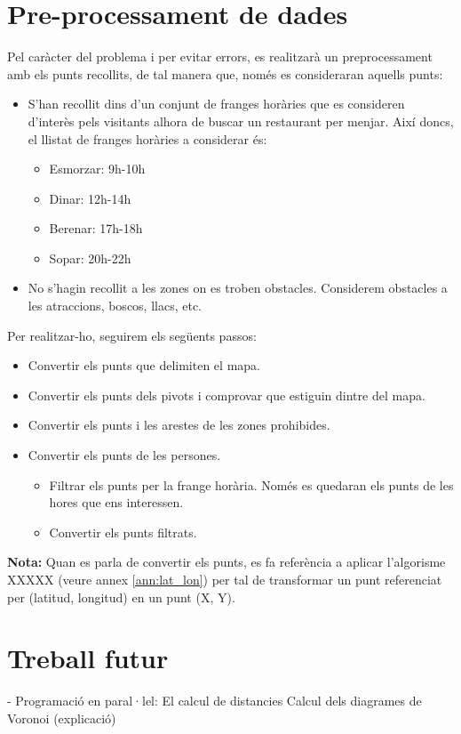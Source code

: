 \documentclass[12pt]{article}
\begin{document}
\clearpage
\section{Pre-processament de dades\label{pd}}
Pel caràcter del problema i per evitar errors, es realitzarà un preprocessament amb els punts recollits, de tal manera que, només es consideraran aquells punts:
\begin{itemize}
	\item S’han recollit dins d’un conjunt de franges horàries que es consideren d'interès pels visitants alhora de buscar un restaurant per menjar. 
	Així doncs, el llistat de franges horàries a considerar és:
	\begin{itemize}
		\item Esmorzar: 9h-10h
		\item Dinar: 12h-14h
		\item Berenar: 17h-18h
		\item Sopar: 20h-22h
	\end{itemize}

	\item No s’hagin recollit a les zones on es troben obstacles. 
	Considerem obstacles a les atraccions, boscos, llacs, etc.
\end{itemize}

Per realitzar-ho, seguirem els següents passos:
\begin{itemize}
	\item Convertir els punts que delimiten el mapa.
	\item Convertir els punts dels pivots i comprovar que estiguin dintre del mapa.
	\item Convertir els punts i les arestes de les zones prohibides.
	\item Convertir els punts de les persones.
	\begin{itemize}
		\item Filtrar els punts per la frange horària. Només es quedaran els punts de les hores que ens interessen.
		\item Convertir els punts filtrats.
	\end{itemize}
\end{itemize}

\textbf{Nota:} Quan es parla de convertir els punts, es fa referència a aplicar l'algorisme XXXXX (veure annex \ref{ann:lat_lon}) per tal de transformar un punt referenciat per (latitud, longitud) en un punt (X, Y).

\clearpage
\section{Treball futur}
- Programació en paral·lel:
	El calcul de distancies
	Calcul dels diagrames de Voronoi (explicació)
\end{document}
